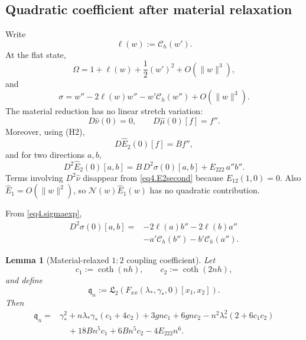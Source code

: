 \documentclass[12pt]{article}
\numberwithin{equation}{section}
\newtheorem{lemma}[theorem]{Lemma}
\numberwithin{equation}{section}
\begin{document}
\subsection{Quadratic coefficient after material relaxation}

Write
\[
\ell(w):=\mathcal C_h(w').
\]
At the flat state,
\begin{equation}\label{eq4.geomexp}
\Omega
=
1+\ell(w)+\frac12(w')^2+O(\|w\|^3),
\end{equation}
and
\begin{equation}\label{eq4.sigmaexp}
\sigma
=
w''-2\ell(w)w''-w'\mathcal C_h(w'')
+O(\|w\|^3).
\end{equation}
The material reduction has no linear stretch variation:
\[
D\widehat\nu(0)=0,\qquad
D\widehat\mu(0)[f]=f''.
\]
Moreover, using (H2),
\begin{equation}\label{eq4.E2exp}
D\widehat E_2(0)[f]=Bf'',
\end{equation}
and for two directions $a,b$,
\begin{equation}\label{eq4.E2second}
D^2\widehat E_2(0)[a,b]
=
B\,D^2\sigma(0)[a,b]
+E_{222}\,a''b''.
\end{equation}
Terms involving $D^2\widehat\nu$ disappear from \eqref{eq4.E2second} because
$E_{12}(1,0)=0$.  Also $\widehat E_1=O(\|w\|^2)$, so
$\mathcal N(w)\widehat E_1(w)$ has no quadratic contribution.

From \eqref{eq4.sigmaexp},
\begin{equation}\label{eq4.sigmasecond}
\begin{aligned}
D^2\sigma(0)[a,b]
={}&-2\ell(a)b''-2\ell(b)a''\\
&-a'\mathcal C_h(b'')-b'\mathcal C_h(a'').
\end{aligned}
\end{equation}

\begin{lemma}[Material-relaxed $1{:}2$ coupling coefficient]\label{lem4q}
Let
\[
c_1:=\coth(nh),\qquad c_2:=\coth(2nh),
\]
and define
\begin{equation}\label{eq4.qdef}
\mathfrak q_n
:=
\mathfrak L_2
\left(
F_{xx}(\lambda_*,\gamma_*,0)[x_1,x_2]
\right).
\end{equation}
Then
\begin{align}\label{eq4.qexplicit}
\mathfrak q_n={}&
\gamma_*^2
+n\lambda_*\gamma_*(c_1+4c_2)
+3gnc_1+6gnc_2
-n^2\lambda_*^2(2+6c_1c_2)
\nonumber\\
&\quad
+18Bn^5c_1+6Bn^5c_2
-4E_{222}n^6 .
\end{align}
\end{lemma}
\end{document}

